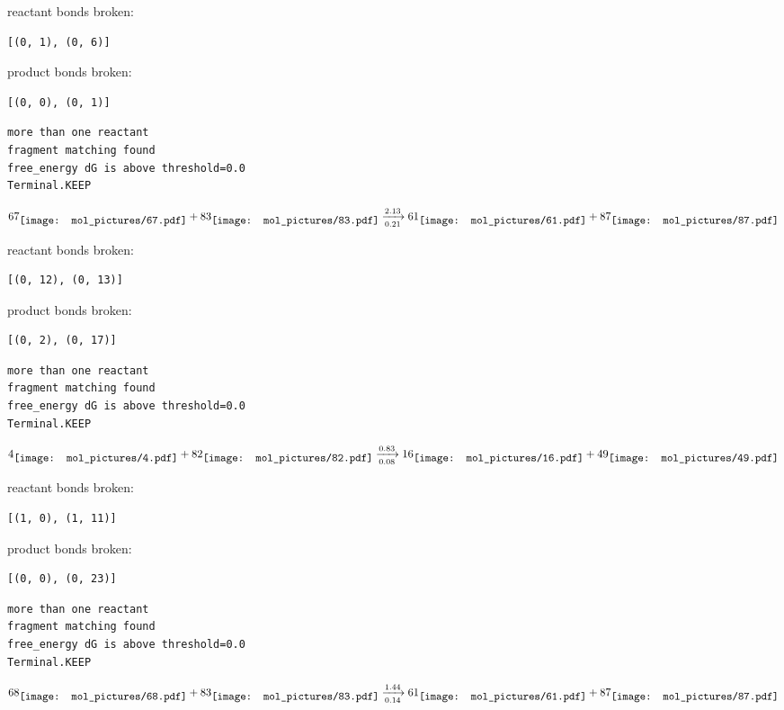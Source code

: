 \documentclass{article}
\begin{document}
reactant bonds broken:\begin{verbatim}
[(0, 1), (0, 6)]
\end{verbatim}
product bonds broken:\begin{verbatim}
[(0, 0), (0, 1)]
\end{verbatim}




\vspace{1cm}
\begin{verbatim}
more than one reactant
fragment matching found
free_energy dG is above threshold=0.0
Terminal.KEEP
\end{verbatim}
$$
67
\raisebox{-.5\height}{\texttt{[image: mol\_pictures/67.pdf]}}
+
83
\raisebox{-.5\height}{\texttt{[image: mol\_pictures/83.pdf]}}
\xrightarrow[0.21]{2.13}
61
\raisebox{-.5\height}{\texttt{[image: mol\_pictures/61.pdf]}}
+
87
\raisebox{-.5\height}{\texttt{[image: mol\_pictures/87.pdf]}}
$$


reactant bonds broken:\begin{verbatim}
[(0, 12), (0, 13)]
\end{verbatim}
product bonds broken:\begin{verbatim}
[(0, 2), (0, 17)]
\end{verbatim}




\vspace{1cm}
\begin{verbatim}
more than one reactant
fragment matching found
free_energy dG is above threshold=0.0
Terminal.KEEP
\end{verbatim}
$$
4
\raisebox{-.5\height}{\texttt{[image: mol\_pictures/4.pdf]}}
+
82
\raisebox{-.5\height}{\texttt{[image: mol\_pictures/82.pdf]}}
\xrightarrow[0.08]{0.83}
16
\raisebox{-.5\height}{\texttt{[image: mol\_pictures/16.pdf]}}
+
49
\raisebox{-.5\height}{\texttt{[image: mol\_pictures/49.pdf]}}
$$


reactant bonds broken:\begin{verbatim}
[(1, 0), (1, 11)]
\end{verbatim}
product bonds broken:\begin{verbatim}
[(0, 0), (0, 23)]
\end{verbatim}




\vspace{1cm}
\begin{verbatim}
more than one reactant
fragment matching found
free_energy dG is above threshold=0.0
Terminal.KEEP
\end{verbatim}
$$
68
\raisebox{-.5\height}{\texttt{[image: mol\_pictures/68.pdf]}}
+
83
\raisebox{-.5\height}{\texttt{[image: mol\_pictures/83.pdf]}}
\xrightarrow[0.14]{1.44}
61
\raisebox{-.5\height}{\texttt{[image: mol\_pictures/61.pdf]}}
+
87
\raisebox{-.5\height}{\texttt{[image: mol\_pictures/87.pdf]}}
$$
\end{document}
